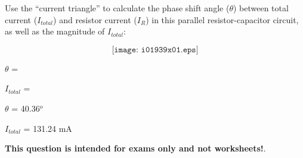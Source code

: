 

Use the ``current triangle'' to calculate the phase shift angle ($\theta$) between total current ($I_{total}$) and resistor current ($I_R$) in this parallel resistor-capacitor circuit, as well as the magnitude of $I_{total}$:

$$\texttt{[image: i01939x01.eps]}$$

\vskip 20pt

$\theta$ = 

\vskip 10pt

$I_{total}$ = 







$\theta$ = 40.36$^{o}$

\vskip 10pt

$I_{total}$ = 131.24 mA







{\bf This question is intended for exams only and not worksheets!}.



